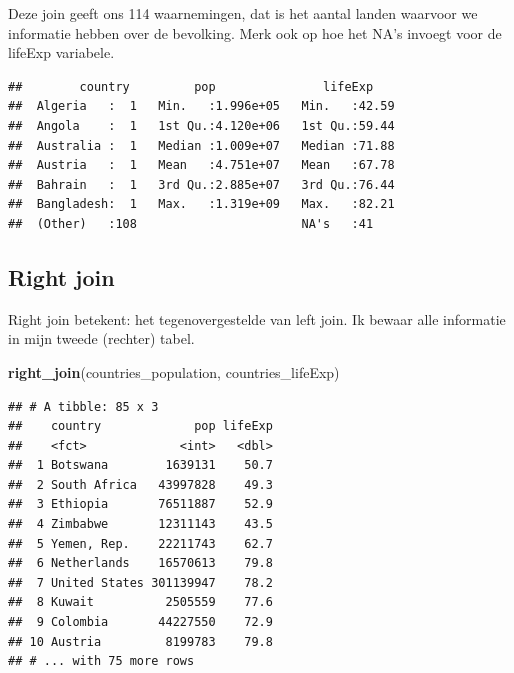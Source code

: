 \documentclass[]{tufte-book}
\newenvironment{Shaded}{}{}
\newcommand{\KeywordTok}[1]{\textcolor[rgb]{0.00,0.44,0.13}{\textbf{#1}}}
\newcommand{\NormalTok}[1]{#1}
\newcommand{\OperatorTok}[1]{\textcolor[rgb]{0.40,0.40,0.40}{#1}}
\newcommand{\StringTok}[1]{\textcolor[rgb]{0.25,0.44,0.63}{#1}}
\begin{document}
Deze join geeft ons 114 waarnemingen, dat is het aantal landen waarvoor we informatie hebben over de bevolking. Merk ook op hoe het NA's invoegt voor de lifeExp variabele.

\begin{Shaded}
\end{Shaded}

\begin{verbatim}
##        country         pop               lifeExp     
##  Algeria   :  1   Min.   :1.996e+05   Min.   :42.59  
##  Angola    :  1   1st Qu.:4.120e+06   1st Qu.:59.44  
##  Australia :  1   Median :1.009e+07   Median :71.88  
##  Austria   :  1   Mean   :4.751e+07   Mean   :67.78  
##  Bahrain   :  1   3rd Qu.:2.885e+07   3rd Qu.:76.44  
##  Bangladesh:  1   Max.   :1.319e+09   Max.   :82.21  
##  (Other)   :108                       NA's   :41
\end{verbatim}

\hypertarget{right-join}{%
\subsection{Right join}\label{right-join}}

Right join betekent: het tegenovergestelde van left join. Ik bewaar alle informatie in mijn tweede (rechter) tabel.

\begin{Shaded}
\begin{Highlighting}[]
\KeywordTok{right_join}\NormalTok{(countries_population, countries_lifeExp)}
\end{Highlighting}
\end{Shaded}

\begin{verbatim}
## # A tibble: 85 x 3
##    country             pop lifeExp
##    <fct>             <int>   <dbl>
##  1 Botswana        1639131    50.7
##  2 South Africa   43997828    49.3
##  3 Ethiopia       76511887    52.9
##  4 Zimbabwe       12311143    43.5
##  5 Yemen, Rep.    22211743    62.7
##  6 Netherlands    16570613    79.8
##  7 United States 301139947    78.2
##  8 Kuwait          2505559    77.6
##  9 Colombia       44227550    72.9
## 10 Austria         8199783    79.8
## # ... with 75 more rows
\end{verbatim}
\end{document}
